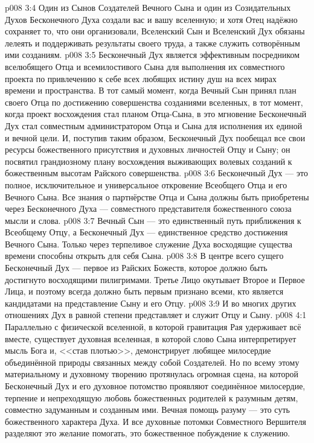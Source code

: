 \vs p008 3:4 Один из Сынов Создателей Вечного Сына и один из Созидательных Духов Бесконечного Духа создали вас и вашу вселенную; и хотя Отец надёжно сохраняет то, что они организовали, Вселенский Сын и Вселенский Дух обязаны лелеять и поддерживать результаты своего труда, а также служить сотворённым ими созданиям.
\vs p008 3:5 \pc Бесконечный Дух является эффективным посредником вселюбящего Отца и всемилостивого Сына для выполнения их совместного проекта по привлечению к себе всех любящих истину душ на всех мирах времени и пространства. В тот самый момент, когда Вечный Сын принял план своего Отца по достижению совершенства созданиями вселенных, в тот момент, когда проект восхождения стал планом Отца\hyp{}Сына, в это мгновение Бесконечный Дух стал совместным администратором Отца и Сына для исполнения их единой и вечной цели. И, поступив таким образом, Бесконечный Дух пообещал все свои ресурсы божественного присутствия и духовных личностей Отцу и Сыну; он посвятил  грандиозному плану восхождения выживающих волевых созданий к божественным высотам Райского совершенства.
\vs p008 3:6 Бесконечный Дух --- это полное, исключительное и универсальное откровение Всеобщего Отца и его Вечного Сына. Все знания о партнёрстве Отца и Сына должны быть приобретены через Бесконечного Духа --- совместного представителя божественного союза мысли и слова.
\vs p008 3:7 Вечный Сын --- это единственный путь приближения к Всеобщему Отцу, а Бесконечный Дух --- единственное средство достижения Вечного Сына. Только через терпеливое служение Духа восходящие существа времени способны открыть для себя Сына.
\vs p008 3:8 В центре всего сущего Бесконечный Дух --- первое из Райских Божеств, которое должно быть достигнуто восходящими пилигримами. Третье Лицо окутывает Второе и Первое Лица, и поэтому всегда должно быть первым признано всеми, кто является кандидатами на представление Сыну и его Отцу.
\vs p008 3:9 И во многих других отношениях Дух в равной степени представляет и служит Отцу и Сыну.
\vs p008 4:1 Параллельно с физической вселенной, в которой гравитация Рая удерживает всё вместе, существует духовная вселенная, в которой слово Сына интерпретирует мысль Бога и, <<став плотью>>, демонстрирует любящее милосердие объединённой природы связанных между собой Создателей. Но по всему этому материальному и духовному творению протянулась огромная сцена, на которой Бесконечный Дух и его духовное потомство проявляют соединённое милосердие, терпение и непреходящую любовь божественных родителей к разумным детям, совместно задуманным и созданным ими. Вечная помощь разуму --- это суть божественного характера Духа. И все духовные потомки Совместного Вершителя разделяют это желание помогать, это божественное побуждение к служению.
